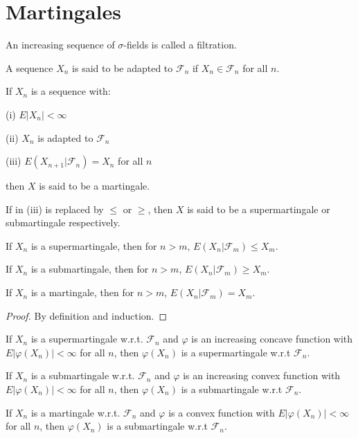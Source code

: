 \section{Martingales}
\begin{definition}[filtration]
An increasing sequence of $\sigma$-fields is called a filtration.
\end{definition}
\begin{definition}[adapted]
A sequence $X_n$ is said to be adapted to $\mathcal{F}_n$ if $X_n\in\mathcal{F}_n$ for all $n$.
\end{definition}
\begin{definition}[martingale]
If $X_n$ is a sequence with:\par
(i) $E\left|X_n\right|<\infty$\par
(ii) $X_n$ is adapted to $\mathcal{F}_n$\par
(iii) $E(X_{n+1}|\mathcal{F}_n)=X_n$ for all $n$\par
then $X$ is said to be a martingale.
\end{definition}
\begin{remark}
If in (iii) is replaced by $\le$ or $\geq$, then $X$ is said to be a supermartingale or submartingale respectively.
\end{remark}
\begin{theorem}
If $X_n$ is a supermartingale, then for $n>m$, $E(X_n|\mathcal{F}_m)\le X_m$.\par
If $X_n$ is a submartingale, then for $n>m$, $E(X_n|\mathcal{F}_m)\geq X_m$.\par
If $X_n$ is a martingale, then for $n>m$, $E(X_n|\mathcal{F}_m)= X_m$.
\end{theorem}
\begin{proof}
By definition and induction.
\end{proof}
\begin{theorem}
If $X_n$ is a supermartingale w.r.t. $\mathcal{F}_n$ and $\varphi$ is an increasing  concave function with $E\left|\varphi(X_n)\right|<\infty$ for all $n$, then $\varphi(X_n)$ is a supermartingale w.r.t $\mathcal{F}_n$. \par
If $X_n$ is a submartingale w.r.t. $\mathcal{F}_n$ and $\varphi$ is an increasing  convex function with $E\left|\varphi(X_n)\right|<\infty$ for all $n$, then $\varphi(X_n)$ is a submartingale w.r.t $\mathcal{F}_n$. \par
If $X_n$ is a martingale w.r.t. $\mathcal{F}_n$ and $\varphi$ is a convex function with $E\left|\varphi(X_n)\right|<\infty$ for all $n$, then $\varphi(X_n)$ is a submartingale w.r.t $\mathcal{F}_n$. 
\end{theorem}
